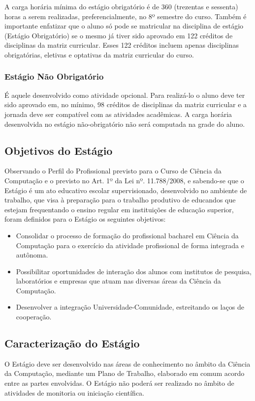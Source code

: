 A carga horária mínima do estágio obrigatório é de 360 (trezentas e sessenta) horas a serem realizadas, preferencialmente, no 8º semestre do curso. Também é importante enfatizar que o aluno só pode se matricular na disciplina de estágio (Estágio Obrigatório) se o mesmo já tiver sido aprovado em 122 créditos de disciplinas da matriz curricular. Esses 122 créditos incluem apenas disciplinas obrigatórias, eletivas e optativas da matriz curricular do curso.


\subsubsection{Estágio Não Obrigatório}
É aquele desenvolvido como atividade opcional. Para realizá-lo o aluno deve ter sido aprovado em, no mínimo, 98 créditos de disciplinas da matriz curricular e a jornada deve ser compatível com as atividades acadêmicas. A carga horária desenvolvida no estágio não-obrigatório não será computada na grade do aluno.


\subsection{Objetivos do Estágio}

Observando o Perfil do Profissional previsto para o Curso de Ciência da Computação e o previsto no Art. 1º da Lei nº. 11.788/2008, e sabendo-se que o Estágio é um ato educativo escolar supervisionado, desenvolvido no ambiente de trabalho, que visa à preparação para o trabalho produtivo de educandos que estejam frequentando o ensino regular em instituições de educação superior, foram definidos para o Estágio os seguintes objetivos:

\begin{itemize}
\item Consolidar o processo de formação do profissional bacharel em Ciência da Computação para o exercício da atividade profissional de forma integrada e autônoma.
\item Possibilitar oportunidades de interação dos alunos com institutos de pesquisa, laboratórios e empresas que atuam nas diversas áreas da Ciência da Computação. 
\item Desenvolver a integração Universidade-Comunidade, estreitando os laços de cooperação.
\end{itemize}

\subsection{Caracterização do Estágio}
O Estágio deve ser desenvolvido nas áreas de conhecimento no âmbito da Ciência da Computação, mediante um Plano de Trabalho, elaborado em comum acordo entre as partes envolvidas. O Estágio não poderá ser realizado no âmbito de atividades de monitoria ou iniciação científica.

